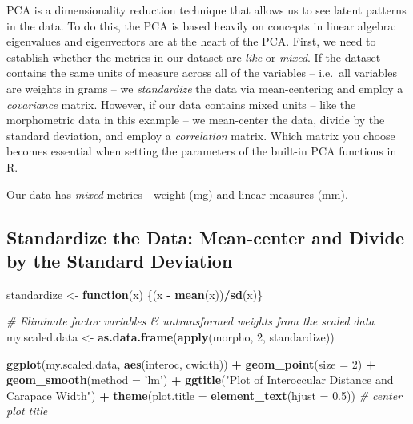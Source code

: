 \documentclass[]{article}
\newenvironment{Shaded}{\begin{snugshade}}{\end{snugshade}}
\newcommand{\CommentTok}[1]{\textcolor[rgb]{0.56,0.35,0.01}{\textit{#1}}}
\newcommand{\ControlFlowTok}[1]{\textcolor[rgb]{0.13,0.29,0.53}{\textbf{#1}}}
\newcommand{\DataTypeTok}[1]{\textcolor[rgb]{0.13,0.29,0.53}{#1}}
\newcommand{\DecValTok}[1]{\textcolor[rgb]{0.00,0.00,0.81}{#1}}
\newcommand{\FloatTok}[1]{\textcolor[rgb]{0.00,0.00,0.81}{#1}}
\newcommand{\KeywordTok}[1]{\textcolor[rgb]{0.13,0.29,0.53}{\textbf{#1}}}
\newcommand{\NormalTok}[1]{#1}
\newcommand{\OperatorTok}[1]{\textcolor[rgb]{0.81,0.36,0.00}{\textbf{#1}}}
\newcommand{\StringTok}[1]{\textcolor[rgb]{0.31,0.60,0.02}{#1}}
\begin{document}
PCA is a dimensionality reduction technique that allows us to see latent
patterns in the data. To do this, the PCA is based heavily on concepts
in linear algebra: eigenvalues and eigenvectors are at the heart of the
PCA. First, we need to establish whether the metrics in our dataset are
\emph{like} or \emph{mixed}. If the dataset contains the same units of
measure across all of the variables -- i.e.~all variables are weights in
grams -- we \emph{standardize} the data via mean-centering and employ a
\emph{covariance} matrix. However, if our data contains mixed units --
like the morphometric data in this example -- we mean-center the data,
divide by the standard deviation, and employ a \emph{correlation}
matrix. Which matrix you choose becomes essential when setting the
parameters of the built-in PCA functions in R.

Our data has \emph{mixed} metrics - weight (mg) and linear measures
(mm).

\hypertarget{standardize-the-data-mean-center-and-divide-by-the-standard-deviation}{%
\subsection{Standardize the Data: Mean-center and Divide by the Standard
Deviation}\label{standardize-the-data-mean-center-and-divide-by-the-standard-deviation}}

\begin{Shaded}
\begin{Highlighting}[]
\NormalTok{standardize <-}\StringTok{ }\ControlFlowTok{function}\NormalTok{(x) \{(x }\OperatorTok{-}\StringTok{ }\KeywordTok{mean}\NormalTok{(x))}\OperatorTok{/}\KeywordTok{sd}\NormalTok{(x)\}}

\CommentTok{# Eliminate factor variables & untransformed weights from the scaled data}
\NormalTok{my.scaled.data <-}\StringTok{ }\KeywordTok{as.data.frame}\NormalTok{(}\KeywordTok{apply}\NormalTok{(morpho, }\DecValTok{2}\NormalTok{, standardize))}

\KeywordTok{ggplot}\NormalTok{(my.scaled.data, }\KeywordTok{aes}\NormalTok{(interoc, cwidth)) }\OperatorTok{+}
\StringTok{  }\KeywordTok{geom_point}\NormalTok{(}\DataTypeTok{size =} \DecValTok{2}\NormalTok{) }\OperatorTok{+}
\StringTok{  }\KeywordTok{geom_smooth}\NormalTok{(}\DataTypeTok{method =} \StringTok{'lm'}\NormalTok{) }\OperatorTok{+}
\StringTok{  }\KeywordTok{ggtitle}\NormalTok{(}\StringTok{"Plot of Interoccular Distance and Carapace Width"}\NormalTok{) }\OperatorTok{+}
\StringTok{  }\KeywordTok{theme}\NormalTok{(}\DataTypeTok{plot.title =} \KeywordTok{element_text}\NormalTok{(}\DataTypeTok{hjust =} \FloatTok{0.5}\NormalTok{)) }\CommentTok{# center plot title}
\end{Highlighting}
\end{Shaded}
\end{document}
